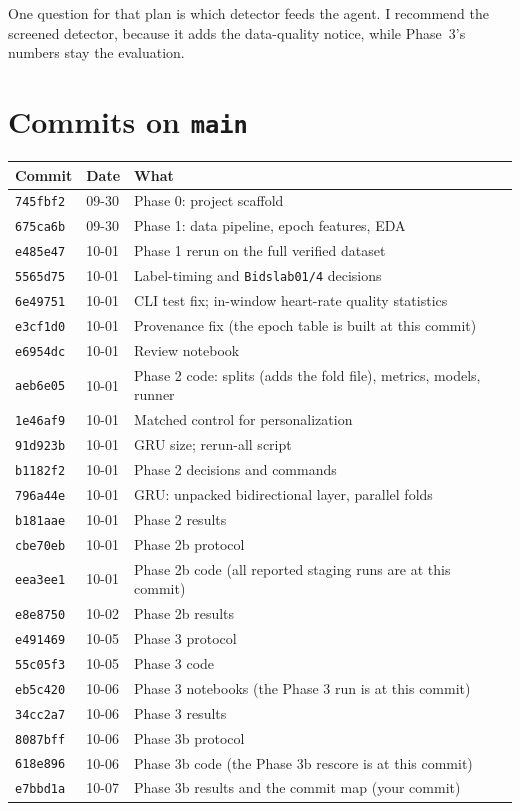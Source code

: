 \documentclass[11pt,a4paper]{article}
\newcommand{\night}[2]{\texttt{Bidslab#1/#2}}
\newcommand{\commit}[1]{\texttt{#1}}
\begin{document}
One question for that plan is which detector feeds the agent. I recommend the screened detector,
because it adds the data-quality notice, while Phase~3's numbers stay the evaluation.

\appendix
\section{Commits on \texttt{main}}
{\small
\begin{longtable}{lll}
\toprule
Commit & Date & What \\
\midrule
\endhead
\commit{745fbf2} & 09-30 & Phase 0: project scaffold \\
\commit{675ca6b} & 09-30 & Phase 1: data pipeline, epoch features, EDA \\
\commit{e485e47} & 10-01 & Phase 1 rerun on the full verified dataset \\
\commit{5565d75} & 10-01 & Label-timing and \night{01}{4} decisions \\
\commit{6e49751} & 10-01 & CLI test fix; in-window heart-rate quality statistics \\
\commit{e3cf1d0} & 10-01 & Provenance fix (the epoch table is built at this commit) \\
\commit{e6954dc} & 10-01 & Review notebook \\
\commit{aeb6e05} & 10-01 & Phase 2 code: splits (adds the fold file), metrics, models, runner \\
\commit{1e46af9} & 10-01 & Matched control for personalization \\
\commit{91d923b} & 10-01 & GRU size; rerun-all script \\
\commit{b1182f2} & 10-01 & Phase 2 decisions and commands \\
\commit{796a44e} & 10-01 & GRU: unpacked bidirectional layer, parallel folds \\
\commit{b181aae} & 10-01 & Phase 2 results \\
\commit{cbe70eb} & 10-01 & Phase 2b protocol \\
\commit{eea3ee1} & 10-01 & Phase 2b code (all reported staging runs are at this commit) \\
\commit{e8e8750} & 10-02 & Phase 2b results \\
\commit{e491469} & 10-05 & Phase 3 protocol \\
\commit{55c05f3} & 10-05 & Phase 3 code \\
\commit{eb5c420} & 10-06 & Phase 3 notebooks (the Phase 3 run is at this commit) \\
\commit{34cc2a7} & 10-06 & Phase 3 results \\
\commit{8087bff} & 10-06 & Phase 3b protocol \\
\commit{618e896} & 10-06 & Phase 3b code (the Phase 3b rescore is at this commit) \\
\commit{e7bbd1a} & 10-07 & Phase 3b results and the commit map (your commit) \\
\bottomrule
\end{longtable}}
\end{document}
